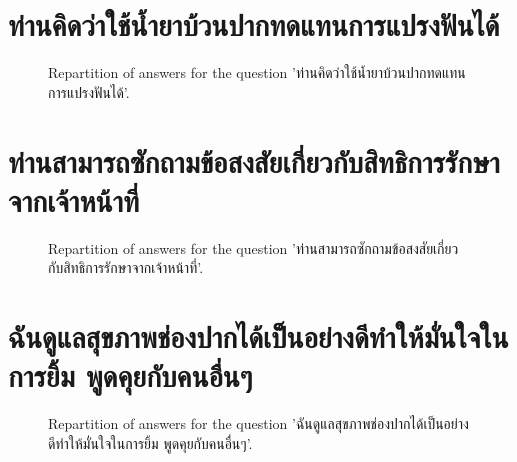 \documentclass[12pt]{article}
\begin{document}
\clearpage{}
\section{ท่านคิดว่าใช้น้ำยาบ้วนปากทดแทนการแปรงฟันได้}

\label{sec:108}


\begin{figure}[h!]
    \caption{\label{figure:q108-1}Repartition of answers for the question 'ท่านคิดว่าใช้น้ำยาบ้วนปากทดแทนการแปรงฟันได้'.}
\end{figure}



\clearpage{}
\section{ท่านสามารถซักถามข้อสงสัยเกี่ยวกับสิทธิการรักษาจากเจ้าหน้าที่}

\label{sec:109}


\begin{figure}[h!]
    \caption{\label{figure:q109-1}Repartition of answers for the question 'ท่านสามารถซักถามข้อสงสัยเกี่ยวกับสิทธิการรักษาจากเจ้าหน้าที่'.}
\end{figure}



\clearpage{}
\section{ฉันดูแลสุขภาพช่องปากได้เป็นอย่างดีทำให้มั่นใจในการยิ้ม พูดคุยกับคนอื่นๆ}

\label{sec:110}


\begin{figure}[h!]
    \caption{\label{figure:q110-1}Repartition of answers for the question 'ฉันดูแลสุขภาพช่องปากได้เป็นอย่างดีทำให้มั่นใจในการยิ้ม พูดคุยกับคนอื่นๆ'.}
\end{figure}
\end{document}
